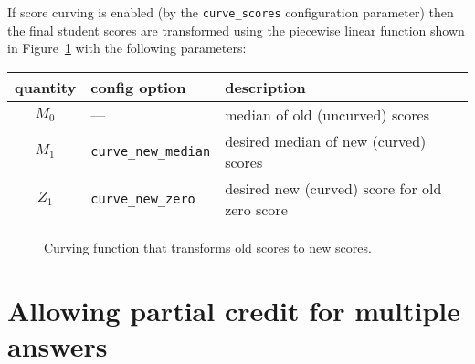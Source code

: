 \documentclass{article}
\begin{document}
If score curving is enabled (by the \texttt{curve_scores}
configuration parameter) then the final student scores are transformed
using the piecewise linear function shown in Figure~\ref{fig:curve}
with the following parameters:
\begin{center}
  \begin{tabular}{cll}
    quantity & config option & description \\
    \hline
    $M_0$ & --- & median of old (uncurved) scores \\
    $M_1$ & \texttt{curve_new_median} & desired median of new (curved) scores \\
    $Z_1$ & \texttt{curve_new_zero} & desired new (curved) score for old zero score
  \end{tabular}
\end{center}

\begin{figure}
  \centering
  \caption{Curving function that transforms old scores to new scores.}
  \label{fig:curve}
\end{figure}

\section{Allowing partial credit for multiple answers}
\end{document}
